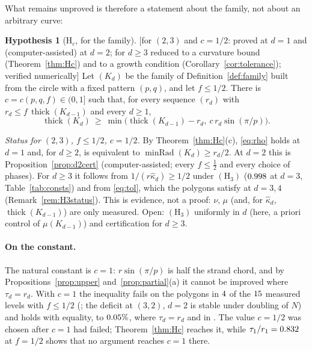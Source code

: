 \documentclass[10pt,a4paper]{article}
\theoremstyle{plain}
\theoremstyle{definition}
\newtheorem{hypothesis}[theorem]{Hypothesis}
\theoremstyle{remark}
\newcommand{\thick}{\operatorname{thick}}
\newcommand{\minRad}{\operatorname{minRad}}
\newcommand{\status}[1]{\textsf{\small [#1]}}
\begin{document}
What remains unproved is therefore a statement about the family, not about an arbitrary curve:

\begin{hypothesis}[$\mathrm H_c$, for the family]\label{hyp}\status{for $(2,3)$ and $c=1/2$: proved at $d=1$ and (computer-assisted) at $d=2$; for $d\ge3$ reduced to a curvature bound (Theorem~\ref{thm:Hc}) and to a growth condition (Corollary~\ref{cor:tolerance}); verified numerically}
Let $(K_d)$ be the family of Definition~\ref{def:family} built from the circle with a fixed pattern $(p,q)$, and let $f\le1/2$. There is $c=c(p,q,f)\in(0,1]$ such that, for every sequence $(r_d)$ with $r_d\le f\,\thick(K_{d-1})$ and every $d\ge1$,
\begin{equation}\label{eq:rho}
\thick(K_d)\ \ge\ \min\bigl(\thick(K_{d-1})-r_d,\ c\,r_d\sin(\pi/p)\bigr).
\end{equation}
\end{hypothesis}

\noindent\emph{Status for $(2,3)$, $f\le1/2$, $c=1/2$.} By Theorem~\ref{thm:Hc}(c), \eqref{eq:rho} holds at $d=1$ and, for $d\ge2$, is equivalent to $\minRad(K_d)\ge r_d/2$. At $d=2$ this is Proposition~\ref{prop:d2cert} (computer-assisted; every $f\le\frac12$ and every choice of phases). For $d\ge3$ it follows from $1/(r\hat\kappa_d)\ge1/2$ under $(\mathrm H_3)$ ($0.998$ at $d=3$, Table~\ref{tab:consts}) and from \eqref{eq:tol}, which the polygons satisfy at $d=3,4$ (Remark~\ref{rem:H3status}). This is evidence, not a proof: $\nu$, $\mu$ (and, for $\hat\kappa_d$, $\thick(K_{d-1})$) are only measured. Open: $(\mathrm H_3)$ uniformly in $d$ (here, a priori control of $\mu(K_{d-1})$) and certification for $d\ge3$.

\paragraph{On the constant.} The natural constant is $c=1$: $r\sin(\pi/p)$ is half the strand chord, and by Propositions~\ref{prop:upper} and~\ref{prop:partial}(a) it cannot be improved where $\tau_d=r_d$. With $c=1$ the inequality fails on the polygons in $4$ of the $15$ measured levels with $f\le1/2$ (\HypFailOneList; the deficit at $(3,2)$, $d=2$ is stable under doubling of $N$) and holds with equality, to $0.05\%$, where $\tau_d=r_d$ and in \HypEqOneListOther. The value $c=1/2$ was chosen after $c=1$ had failed; Theorem~\ref{thm:Hc} reaches it, while $\tau_1/r_1=0.832$ at $f=1/2$ shows that no argument reaches $c=1$ there.
\end{document}
